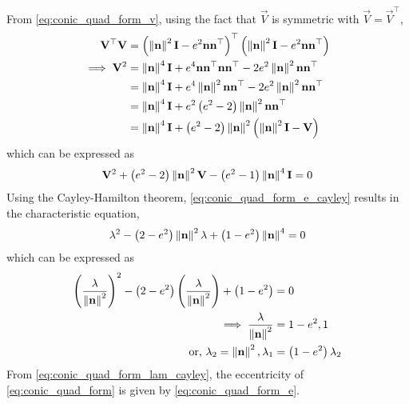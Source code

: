 
	\label{app:conic-parameters}
	From \eqref{eq:conic_quad_form_v}, using the fact that $\vec{V}$ is symmetric with $\vec{V} = \vec{V}^{\top}$,
  \begin{align}
	  \mathbf{V}^{\top} \mathbf{V}&=\left(\left\lVert\mathbf{n}\right\rVert^2\mathbf{I}-e^2\mathbf{n}\mathbf{n}^{\top}\right)^{\top}
	  \left(\left\lVert\mathbf{n}\right\rVert^2\mathbf{I}-e^2\mathbf{n}\mathbf{n}^{\top}\right)
    \\
	  \implies \mathbf{V}^{2} &= \left\lVert\mathbf{n}\right\rVert^4\mathbf{I}+e^4\mathbf{n}\mathbf{n}^{\top}\mathbf{n}\mathbf{n}^{\top}
	  -2e^2\left\lVert\mathbf{n}\right\rVert^2\mathbf{n}\mathbf{n}^{\top}
    \\
	  &= \left\lVert\mathbf{n}\right\rVert^4\mathbf{I} + e^4\left\lVert\mathbf{n}\right\rVert^2\mathbf{n}\mathbf{n}^{\top}
	  - 2e^2\left\lVert\mathbf{n}\right\rVert^2\mathbf{n}\mathbf{n}^{\top}
    \\
	  &= \left\lVert\mathbf{n}\right\rVert^4\mathbf{I} + e^2\left(e^2 - 2\right)\left\lVert\mathbf{n}\right\rVert^2\mathbf{n}\mathbf{n}^{\top}
    \\
	  &= \left\lVert\mathbf{n}\right\rVert^4\mathbf{I} + \left(e^2 - 2\right)\left\lVert\mathbf{n}\right\rVert^2\left(\left\lVert\mathbf{n}\right\rVert^2\mathbf{I}- \mathbf{V}\right)
    \end{align}
%    
which can be expressed as
\begin{align}
  \mathbf{V}^{2} + \left(e^2 - 2\right)\left\lVert\mathbf{n}\right\rVert^2\mathbf{V} - \left(e^2 - 1\right)\left\lVert\mathbf{n}\right\rVert^4\mathbf{I}=0
  \label{eq:conic_quad_form_e_cayley}
\end{align}
	Using the Cayley-Hamilton theorem,
	\eqref{eq:conic_quad_form_e_cayley} results in the characteristic equation, 
\begin{align}
  \lambda^{2} - \left(2-e^2\right)\left\lVert\mathbf{n}\right\rVert^2\lambda + \left(1-e^2 \right)\left\lVert\mathbf{n}\right\rVert^4=0
\end{align}
which can be expressed as
\begin{align}
\left(\frac{\lambda}{\left\lVert\mathbf{n}\right\rVert^2}\right)^2 - \left(2-e^2 \right)\left(\frac{\lambda}{\left\lVert\mathbf{n}\right\rVert^2}\right) 
	+ \left(1-e^2 \right) &= 0
	\\
	\implies \frac{\lambda}{\left\lVert\mathbf{n}\right\rVert^2} &= 1-e^2, 1
  \\
	\text{or, }\lambda_2 = \left\lVert\mathbf{n}\right\rVert^2, \lambda_1 &= \left(1-e^2\right)\lambda_2 
  \label{eq:conic_quad_form_lam_cayley}
\end{align}
From   \eqref{eq:conic_quad_form_lam_cayley}, the eccentricity of \eqref{eq:conic_quad_form} is given by 
\eqref{eq:conic_quad_form_e}.   
%
